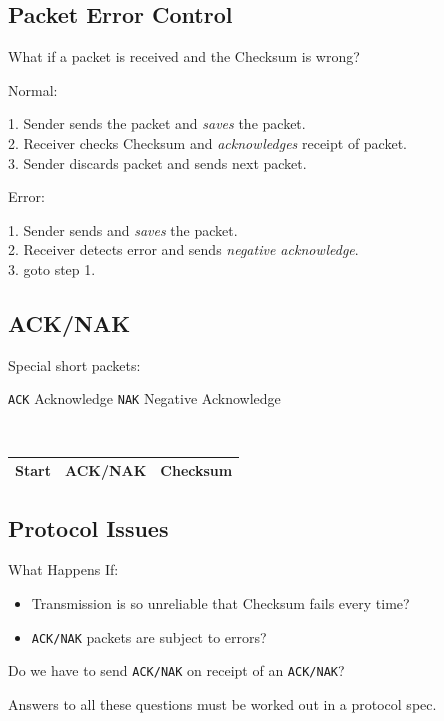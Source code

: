 \documentclass{article}	%
\begin{document}
\subsection{Packet Error Control}

What if a packet is received and the Checksum is wrong?

\noindent
Normal:

1. Sender sends the packet and {\it saves} the packet.\\
2. Receiver checks Checksum and {\it acknowledges} receipt of packet.\\
3. Sender discards packet and sends next packet.

\noindent
Error:

1. Sender sends and {\it saves} the packet.\\
2. Receiver detects error and sends {\it negative acknowledge}.\\
3. goto step 1.


\subsection{ACK/NAK}

Special short packets:

{\tt ACK} Acknowledge
{\tt NAK} Negative Acknowledge

{\tt
\begin{tabular}{|c|c|c|}
\hline
Start &   ACK/NAK &  Checksum  \\
\hline
\end{tabular}
}

\subsection{Protocol Issues}

What Happens If:
\begin{itemize}
        \item Transmission is so unreliable that Checksum fails
                every time?
        \item {\tt ACK/NAK} packets are subject to errors?
\end{itemize}
Do we have to send {\tt ACK/NAK} on receipt of an {\tt ACK/NAK}?

Answers to all these questions must be worked out in a
protocol spec.
\end{document}
